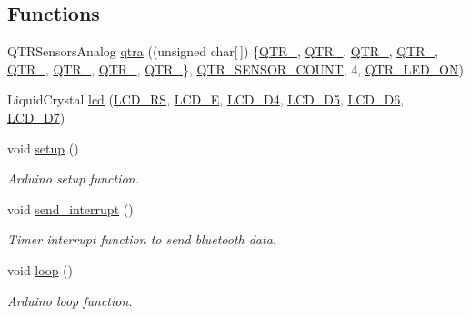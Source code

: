 \subsection*{Functions}
\begin{DoxyCompactItemize}
\item 
Q\+T\+R\+Sensors\+Analog \hyperlink{rbe2001_8ino_aba1edf1920db9237b941ca0f77abbaae}{qtra} ((unsigned char\mbox{[}$\,$\mbox{]}) \{\hyperlink{config_8h_a78fa539ebb20148cbfcad00742561cf6}{Q\+T\+R\+\_}, \hyperlink{config_8h_a49fbc5f0ba729444355eb9ce3588aa40}{Q\+T\+R\+\_}, \hyperlink{config_8h_ae5dcb2e48b67f90a48eddc8d7f1b44ea}{Q\+T\+R\+\_}, \hyperlink{config_8h_a1e52ef437d8700013af2088d388a1cf3}{Q\+T\+R\+\_}, \hyperlink{config_8h_ad90df5df0b2368d826186652cfbe236a}{Q\+T\+R\+\_}, \hyperlink{config_8h_ab683ec86911bbd120c0623b121046420}{Q\+T\+R\+\_}, \hyperlink{config_8h_a5b8ce3aa53de77253e04c5d0eecf97db}{Q\+T\+R\+\_}, \hyperlink{config_8h_a6eef11bb690916992e7933e0ae8e2047}{Q\+T\+R\+\_}\}, \hyperlink{config_8h_a3564cf3b48686cd6404dd989384a56c4}{Q\+T\+R\+\_\+\+S\+E\+N\+S\+O\+R\+\_\+\+C\+O\+U\+NT}, 4, \hyperlink{config_8h_a76643b2e251e861bc3a68e1a70d3e795}{Q\+T\+R\+\_\+\+L\+E\+D\+\_\+\+ON})
\item 
Liquid\+Crystal \hyperlink{rbe2001_8ino_a4cbb289153633c01a1584b3aa0d9a0a2}{lcd} (\hyperlink{config_8h_a4781e073871c6f27f89b9463ad3a4ed1}{L\+C\+D\+\_\+\+RS}, \hyperlink{config_8h_a6ec15b1e813d1f56d2eb644a127e5d49}{L\+C\+D\+\_\+E}, \hyperlink{config_8h_ade7e247311032a474711416da480ed8b}{L\+C\+D\+\_\+\+D4}, \hyperlink{config_8h_a5b91fe480c768d4f246f3890207bfbfc}{L\+C\+D\+\_\+\+D5}, \hyperlink{config_8h_a72e105fcda5fd1c07b5f391379a439d4}{L\+C\+D\+\_\+\+D6}, \hyperlink{config_8h_abd65075e01c7413419581aedee5bcc24}{L\+C\+D\+\_\+\+D7})
\item 
void \hyperlink{rbe2001_8ino_a4fc01d736fe50cf5b977f755b675f11d}{setup} ()
\begin{DoxyCompactList}\small\item\em Arduino setup function. \end{DoxyCompactList}\item 
void \hyperlink{rbe2001_8ino_acb02cd64de9dd91936bfd24d9e1ca769}{send\+\_\+interrupt} ()
\begin{DoxyCompactList}\small\item\em Timer interrupt function to send bluetooth data. \end{DoxyCompactList}\item 
void \hyperlink{rbe2001_8ino_afe461d27b9c48d5921c00d521181f12f}{loop} ()
\begin{DoxyCompactList}\small\item\em Arduino loop function. \end{DoxyCompactList}\end{DoxyCompactItemize}
